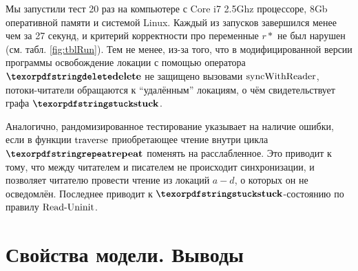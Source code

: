 Мы запустили тест 20 раз на компьютере с Core i7 2.5Ghz процессоре, 8Gb оперативной памяти и системой Linux.
Каждый из запусков завершился менее чем за 27 секунд, и критерий корректности про переменные $r*$ не был нарушен
(см. табл. \ref{fig:tblRun}). Тем не менее, из-за того, что в модифицированной версии программы освобождение
локации с помощью оператора $\kw{delete}$ не защищено вызовами ${\rm syncWithReader}$, потоки-читатели
обращаются к ``удалённым'' локациям, о чём свидетельствует графа $\kw{stuck}$.

Аналогично, рандомизированное тестирование указывает на наличие ошибки, если в функции ${\rm traverse}$
приобретающее чтение внутри цикла $\kw{repeat}$ поменять на расслабленное. Это приводит к тому, что между
читателем и писателем не происходит синхронизации, и позволяет читателю провести чтение из локаций $a-d$,
о которых он не осведомлён. Последнее приводит к $\kw{stuck}$-состоянию по правилу ${\rm Read\text{-}Uninit}$.

\section{Свойства модели. Выводы}
\label{sec:opc11:results}
